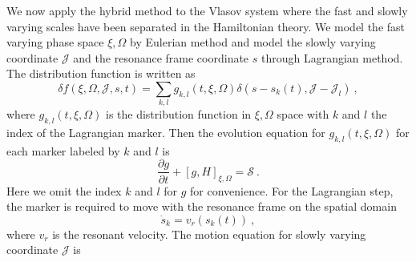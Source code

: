We now apply the hybrid method to the Vlasov system where the fast and slowly varying scales have been separated in the  Hamiltonian theory.
We model the fast varying  phase space $\xi,\Omega$ by Eulerian method and model the slowly varying coordinate
$\mathcal{J}$ 
and the resonance frame  coordinate $s$ through Lagrangian method.
The 
distribution function is written as \cite{shiroto2022}
\begin{equation}
    \delta f(\xi,\Omega,\mathcal{J},s,t) = \sum_{k,l} g_{k,l}(t,\xi,\Omega)\delta(s-s_k(t),\mathcal{J}-\mathcal{J}_l)~,
\end{equation}
where $g_{k,l}(t,\xi,\Omega)$ is the distribution function in $\xi,\Omega$ space with $k$ and $l$ the index of the Lagrangian marker.
Then the evolution equation for $g_{k,l}(t,\xi,\Omega)$ for each marker labeled by $k$ and $l$ is
\begin{equation}\label{eq.Euler}
\frac{\partial g}{\partial t} + \left[g,H\right]_{\xi,\Omega} = \mathcal{S}~.
\end{equation}
Here we omit the index $k$ and $l$ for $g$ for convenience.
For the Lagrangian step, the marker is required to move with the resonance frame on the spatial domain   
\begin{equation}\label{eq.resonance}
        \dot{s}_k = v_r(s_k(t))~,
\end{equation}
where $v_r$ is  the  resonant velocity.
The motion equation for slowly varying coordinate $\mathcal{J}$ is
